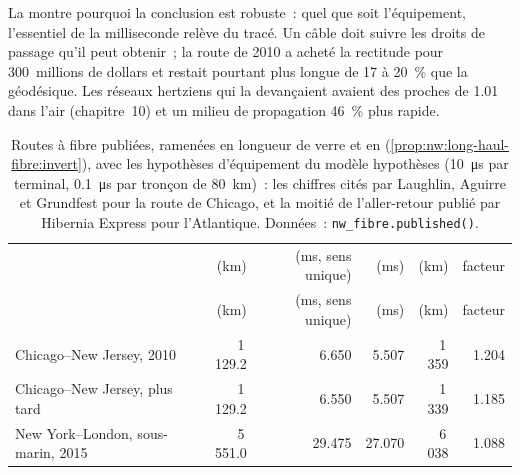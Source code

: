 \begin{omfigure}

\label{fig:nw:long-haul-fibre:sensitivity}
\end{omfigure}

La  montre pourquoi la conclusion est robuste~: quel que soit l'équipement, l'essentiel de la milliseconde relève du tracé. Un câble
doit suivre les droits de passage qu'il peut obtenir~; la route de 2010 a acheté la rectitude pour 300~millions de dollars et restait pourtant plus longue de 17 à 20~\% que la
géodésique. Les réseaux hertziens qui la devançaient avaient des  proches de 1.01 dans l'air (chapitre~10) et un milieu de propagation 46~\% plus rapide.

\begin{table}[ht]
\centering\small
\begin{tabular}{lrrrrr}
\toprule
 & (km) & (ms, sens unique) & (ms) & (km) & facteur \\
 & (km) & (ms, sens unique) & (ms) & (km) & facteur \\
\midrule
Chicago--New Jersey, 2010 & 1\,129.2 & 6.650 & 5.507 & 1\,359 & 1.204 \\
Chicago--New Jersey, plus tard & 1\,129.2 & 6.550 & 5.507 & 1\,339 & 1.185 \\
New York--London, sous-marin, 2015 & 5\,551.0 & 29.475 & 27.070 & 6\,038 & 1.088 \\
\bottomrule
\end{tabular}
\caption{Routes à fibre publiées, ramenées en longueur de verre et en  (\cref{prop:nw:long-haul-fibre:invert}), avec les hypothèses d'équipement du modèle
hypothèses (\qty{10}{\micro\second} par terminal, \qty{0.1}{\micro\second} par tronçon de 80~km)~: les chiffres cités par Laughlin, Aguirre et Grundfest
pour la route de Chicago, et la moitié de l'aller-retour publié par Hibernia Express pour l'Atlantique. Données~: \texttt{nw\_fibre.published()}.}\label{tab:nw:long-haul-fibre:published}
\end{table}

